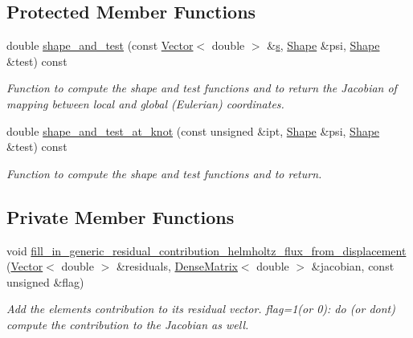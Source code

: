 \subsection*{Protected Member Functions}
\begin{DoxyCompactItemize}
\item 
double \hyperlink{classoomph_1_1FourierDecomposedHelmholtzFluxFromNormalDisplacementBCElement_ae9aa741774cfc14e95ff9113844119f5}{shape\+\_\+and\+\_\+test} (const \hyperlink{classoomph_1_1Vector}{Vector}$<$ double $>$ \&\hyperlink{cfortran_8h_ab7123126e4885ef647dd9c6e3807a21c}{s}, \hyperlink{classoomph_1_1Shape}{Shape} \&psi, \hyperlink{classoomph_1_1Shape}{Shape} \&test) const
\begin{DoxyCompactList}\small\item\em Function to compute the shape and test functions and to return the Jacobian of mapping between local and global (Eulerian) coordinates. \end{DoxyCompactList}\item 
double \hyperlink{classoomph_1_1FourierDecomposedHelmholtzFluxFromNormalDisplacementBCElement_ab9f53637a61bc8a089170011596e5184}{shape\+\_\+and\+\_\+test\+\_\+at\+\_\+knot} (const unsigned \&ipt, \hyperlink{classoomph_1_1Shape}{Shape} \&psi, \hyperlink{classoomph_1_1Shape}{Shape} \&test) const
\begin{DoxyCompactList}\small\item\em Function to compute the shape and test functions and to return. \end{DoxyCompactList}\end{DoxyCompactItemize}
\subsection*{Private Member Functions}
\begin{DoxyCompactItemize}
\item 
void \hyperlink{classoomph_1_1FourierDecomposedHelmholtzFluxFromNormalDisplacementBCElement_a15c86be276d382c3b948f5f8115d3261}{fill\+\_\+in\+\_\+generic\+\_\+residual\+\_\+contribution\+\_\+helmholtz\+\_\+flux\+\_\+from\+\_\+displacement} (\hyperlink{classoomph_1_1Vector}{Vector}$<$ double $>$ \&residuals, \hyperlink{classoomph_1_1DenseMatrix}{Dense\+Matrix}$<$ double $>$ \&jacobian, const unsigned \&flag)
\begin{DoxyCompactList}\small\item\em Add the element\textquotesingle{}s contribution to its residual vector. flag=1(or 0)\+: do (or don\textquotesingle{}t) compute the contribution to the Jacobian as well. \end{DoxyCompactList}\end{DoxyCompactItemize}
